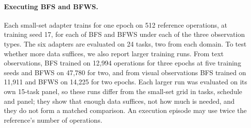 \paragraph{Executing BFS and BFWS.} Each small-set adapter trains for one epoch on 512 reference operations, at training seed 17, for each of BFS and BFWS under each of the three observation types. The six adapters are evaluated on 24 tasks, two from each domain. To test whether more data suffices, we also report larger training runs. From text observations, BFS trained on 12,994 operations for three epochs at five training seeds and BFWS on 47,780 for two, and from visual observations BFS trained on 11,911 and BFWS on 14,225 for two epochs. Each larger run was evaluated on its own 15-task panel, so these runs differ from the small-set grid in tasks, schedule and panel; they show that enough data suffices, not how much is needed, and they do not form a matched comparison. An execution episode may use twice the reference's number of operations.


